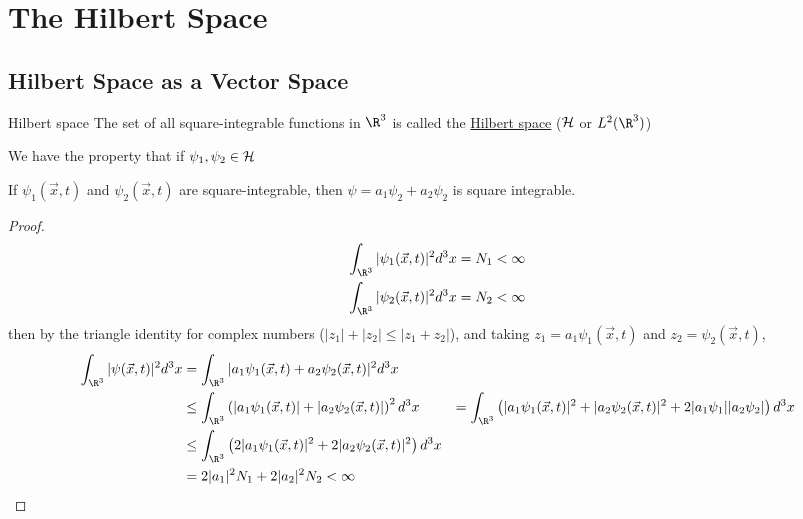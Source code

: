 \documentclass[../Main.tex]{subfiles}
\begin{document}
\section{The Hilbert Space}
\subsection{Hilbert Space as a Vector Space}
\begin{definition}{Hilbert space}
    The set of all square-integrable functions in $\R^3$ is called the \underline{Hilbert space} ($\mathcal{H}$ or $L^2(\R^3)$)
\end{definition}
We have the property that if $\psi_1, \psi_2 \in \mathcal{H}$

\begin{theorem}
    If $\psi_1(\vec{x}, t)$ and $\psi_2(\vec{x}, t)$ are square-integrable, then $\psi = a_1 \psi_2 + a_2 \psi_2$ is square integrable.
    \label{thmSquareIntLinearCombo}
\end{theorem}
\begin{proof}
    \begin{align*}
        \int_{\R^3} |\psi_1(\vec{x}, t)|^2 d^3x &= N_1 < \infty \\
        \int_{\R^3} |\psi_2(\vec{x}, t)|^2 d^3x &= N_2 < \infty 
    \end{align*}
    then by the triangle identity for complex numbers ($|z_1| + |z_2| \leq |z_1 + z_2|$), and taking $z_1 = a_1 \psi_1(\vec{x}, t)$ and $z_2 = \psi_2(\vec{x}, t)$,
    \begin{align*}
        \int_{\R^3} |\psi(\vec{x}, t)|^2 d^3x &= \int_{\R^3} |a_1 \psi_1(\vec{x}, t) + a_2 \psi_2 (\vec{x}, t)|^2 d^3x \\
        &\leq \int_{\R^3} \left(|a_1 \psi_1(\vec{x}, t)| + |a_2 \psi_2 (\vec{x}, t)|\right)^2 d^3x
        &= \int_{\R^3} \left(|a_1 \psi_1(\vec{x}, t)|^2 + |a_2 \psi_2 (\vec{x}, t)|^2+ 2 |a_1 \psi_1||a_2 \psi_2|\right) d^3x \\
        &\leq \int_{\R^3} \left(2|a_1 \psi_1(\vec{x}, t)|^2 + 2|a_2 \psi_2 (\vec{x}, t)|^2\right) d^3x \\
        &= 2|a_1|^2 N_1 + 2|a_2|^2 N_2 < \infty
    \end{align*}
\end{proof}
\end{document}
